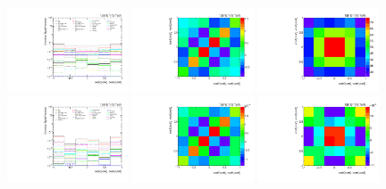 \begin{refsection}
\begin{figure}[htb]
\begin{center}
 \includegraphics[width=0.32\textwidth]{fig_fullRun2UL/unfolding/combined/deltaSystCombinedlog_rebinnedB_c_Mnr.pdf}
 \includegraphics[width=0.32\textwidth]{fig_fullRun2UL/unfolding/combined/StatCovMatrix_rebinnedB_c_Mnr.pdf}
 \includegraphics[width=0.32\textwidth]{fig_fullRun2UL/unfolding/combined/TotalSystCovMatrix_rebinnedB_c_Mnr.pdf} \\
 \includegraphics[width=0.32\textwidth]{fig_fullRun2UL/unfolding/combined/deltaSystCombinedlogNorm_rebinnedB_c_Mnr.pdf}
 \includegraphics[width=0.32\textwidth]{fig_fullRun2UL/unfolding/combined/StatCovMatrixNorm_rebinnedB_c_Mnr.pdf}
 \includegraphics[width=0.32\textwidth]{fig_fullRun2UL/unfolding/combined/TotalSystCovMatrixNorm_rebinnedB_c_Mnr.pdf} \\

\end{center}
\end{figure}
\end{refsection}
